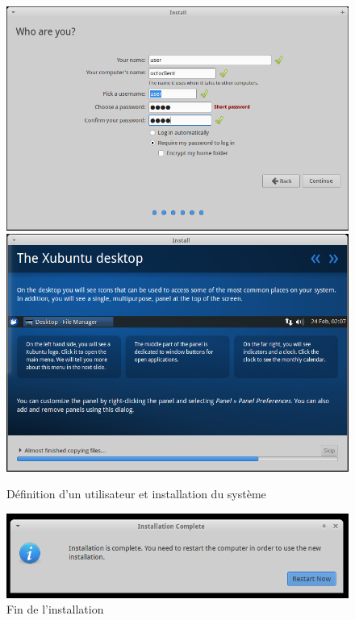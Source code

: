  \begin{figure}[h]
 \includegraphics[scale=0.38]{img/install/Xub_inst_3.png}
 \includegraphics[scale=0.38]{img/install/Xub_inst_4.png}
 \caption{Définition d'un utilisateur et installation du système}
 \end{figure}
 \begin{figure}[h]
 \centering
 \includegraphics[scale=0.5]{img/install/Xub_inst_6.png}
 \caption{Fin de l'installation}
 \end{figure}
